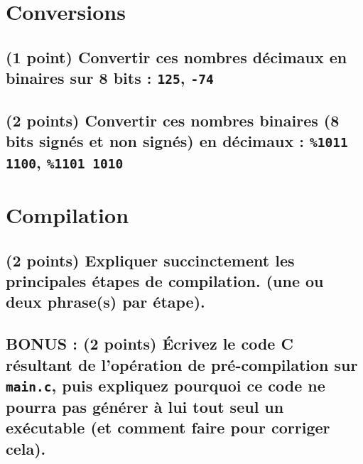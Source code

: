 \documentclass[11pt,a4paper]{article}
\author{Fabrice BOISSIER}
\begin{document}
\setlength{\fboxrule}{2pt}

\noindent {}



%


\section{Conversions} %

\subsection{(1 point) Convertir ces nombres décimaux en binaires sur 8 bits : \texttt{125}, \texttt{-74}}

\bigskip

\subsection{(2 points) Convertir ces nombres binaires (8 bits signés et non signés) en décimaux : \texttt{\%1011 1100}, \texttt{\%1101 1010}}

\bigskip
\bigskip
\bigskip

\section{Compilation} %

\subsection{(2 points) Expliquer succinctement les principales étapes de compilation. (une ou deux phrase(s) par étape).}

\bigskip

\subsection{BONUS : (2 points) \'Ecrivez le code C résultant de l'opération de pré-compilation sur \texttt{main.c}, puis expliquez pourquoi ce code ne pourra pas générer à lui tout seul un exécutable (et comment faire pour corriger cela).}
\end{document}
